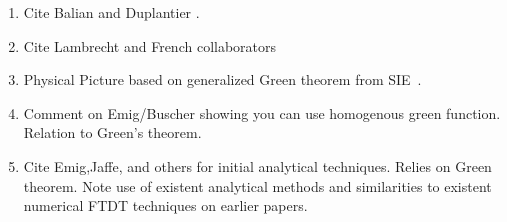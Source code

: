 \begin{enumerate}
\item Cite Balian and Duplantier \cite{Balian1977, Balian1978}.
\item Cite Lambrecht and French collaborators
  \cite{Lambrecht2006, MaiaNeto2008,Canaguier-Durand2012}
\item Physical Picture based on generalized Green theorem from 
  SIE~\cite{Stratton1941}.
\item Comment on Emig/Buscher showing you can use homogenous green function.
  Relation to Green's theorem.
\item Cite Emig,Jaffe,  and others for initial analytical techniques.  Relies on Green theorem.
\cite{Emig2004, Emig2007, Rahi2009}
\cite{Kenneth2006}
  Note use of existent analytical methods and similarities to existent 
  numerical FTDT techniques on earlier papers.  
  \cite{Rodriguez2007,Rodriguez2007a, Rodriguez2009}
\end{enumerate}


